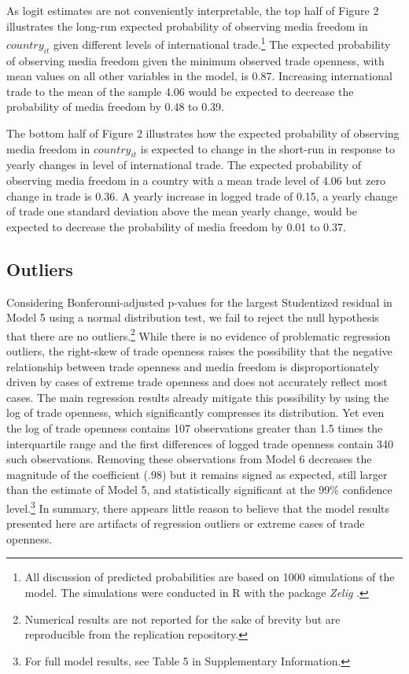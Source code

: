 \documentclass[12pt,a4paper]{article}\usepackage[]{graphicx}\usepackage[]{color}
\begin{document}
As logit estimates are not conveniently interpretable, the top half of Figure 2 illustrates the long-run expected probability of observing media freedom in $country_{it}$ given different levels of international trade.\footnote{All discussion of predicted probabilities are based on 1000 simulations of the model. The simulations were conducted in R with the package \emph{Zelig} \parencite*{ZeligEveryonesSt:2009ts}.} The expected probability of observing media freedom given the minimum observed trade openness, with mean values on all other variables in the model, is 0.87. Increasing international trade to the mean of the sample 4.06 would be expected to decrease the probability of media freedom by 0.48 to 0.39.

The bottom half of Figure 2 illustrates how the expected probability of observing media freedom in $country_{it}$ is expected to change in the short-run in response to yearly changes in level of international trade. The expected probability of observing media freedom in a country with a mean trade level of 4.06 but zero change in trade is 0.36. A yearly increase in logged trade of 0.15, a yearly change of trade one standard deviation above the mean yearly change, would be expected to decrease the probability of media freedom by 0.01 to 0.37.



\subsection{Outliers}

Considering Bonferonni-adjusted p-values for the largest Studentized residual in Model 5 using a normal distribution test, we fail to reject the null hypothesis that there are no outliers.\footnote{Numerical results are not reported for the sake of brevity but are reproducible from the replication repository.} While there is no evidence of problematic regression outliers, the right-skew of trade openness raises the possibility that the negative relationship between trade openness and media freedom is disproportionately driven by cases of extreme trade openness and does not accurately reflect most cases. The main regression results already mitigate this possibility by using the log of trade openness, which significantly compresses its distribution. Yet even the log of trade openness contains 107 observations greater than 1.5 times the interquartile range and the first differences of logged trade openness contain 340 such observations. Removing these observations from Model 6 decreases the magnitude of the coefficient (.98) but it remains signed as expected, still larger than the estimate of Model 5, and statistically significant at the 99\% confidence level.\footnote{For full model results, see Table 5 in Supplementary Information.} In summary, there appears little reason to believe that the model results presented here are artifacts of regression outliers or extreme cases of trade openness.
\end{document}
